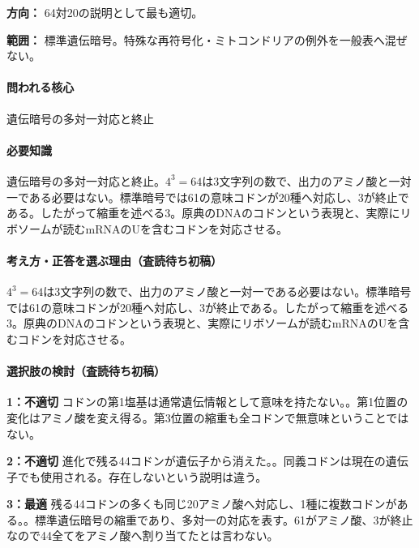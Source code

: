 \noindent\textbf{方向：} 64対20の説明として最も適切。\par

\noindent\textbf{範囲：} 標準遺伝暗号。特殊な再符号化・ミトコンドリアの例外を一般表へ混ぜない。\par

\paragraph{問われる核心} 遺伝暗号の多対一対応と終止

\paragraph{必要知識} 遺伝暗号の多対一対応と終止。\(4^3=64\)は3文字列の数で、出力のアミノ酸と一対一である必要はない。標準暗号では61の意味コドンが20種へ対応し、3が終止である。したがって縮重を述べる3。原典のDNAのコドンという表現と、実際にリボソームが読むmRNAのUを含むコドンを対応させる。

\paragraph{考え方・正答を選ぶ理由（査読待ち初稿）} \(4^3=64\)は3文字列の数で、出力のアミノ酸と一対一である必要はない。標準暗号では61の意味コドンが20種へ対応し、3が終止である。したがって縮重を述べる3。原典のDNAのコドンという表現と、実際にリボソームが読むmRNAのUを含むコドンを対応させる。

\paragraph{選択肢の検討（査読待ち初稿）}\mbox{}\par

\noindent\textbf{1：不適切} コドンの第1塩基は通常遺伝情報として意味を持たない。。第1位置の変化はアミノ酸を変え得る。第3位置の縮重も全コドンで無意味ということではない。\par

\noindent\textbf{2：不適切} 進化で残る44コドンが遺伝子から消えた。。同義コドンは現在の遺伝子でも使用される。存在しないという説明は違う。\par

\noindent\textbf{3：最適} 残る44コドンの多くも同じ20アミノ酸へ対応し、1種に複数コドンがある。。標準遺伝暗号の縮重であり、多対一の対応を表す。61がアミノ酸、3が終止なので44全てをアミノ酸へ割り当てたとは言わない。\par

